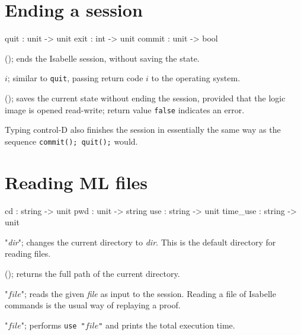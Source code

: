 \section{Ending a session}
\begin{ttbox} 
quit    : unit -> unit
exit    : int -> unit
commit  : unit -> bool
\end{ttbox}
\begin{ttdescription}
\item[\ttindexbold{quit}();] ends the Isabelle session, without saving
  the state.
  
\item[\ttindexbold{exit} \(i\);] similar to {\tt quit}, passing return
  code \(i\) to the operating system.

\item[\ttindexbold{commit}();] saves the current state without ending
  the session, provided that the logic image is opened read-write;
  return value {\tt false} indicates an error.
\end{ttdescription}

Typing control-D also finishes the session in essentially the same way
as the sequence {\tt commit(); quit();} would.


\section{Reading ML files}
\begin{ttbox} 
cd              : string -> unit
pwd             : unit -> string
use             : string -> unit
time_use        : string -> unit
\end{ttbox}
\begin{ttdescription}
\item[\ttindexbold{cd} "{\it dir}";] changes the current directory to
  {\it dir}.  This is the default directory for reading files.
  
\item[\ttindexbold{pwd}();] returns the full path of the current
  directory.

\item[\ttindexbold{use} "$file$";]  
reads the given {\it file} as input to the \ML{} session.  Reading a file
of Isabelle commands is the usual way of replaying a proof.

\item[\ttindexbold{time_use} "$file$";]  
performs {\tt use~"$file$"} and prints the total execution time.
\end{ttdescription}

